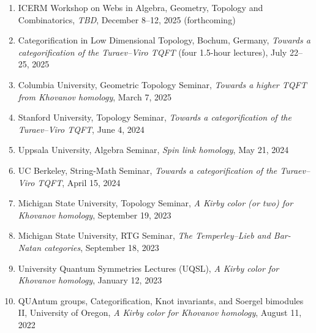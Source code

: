 \documentclass[10pt]{article}
\begin{document}
%
%
%
\begin{enumerate}

\item ICERM Workshop on Webs in Algebra, Geometry, Topology and Combinatorics, 
\emph{TBD},
December 8--12, 2025 (forthcoming)

\item Categorification in Low Dimensional Topology,
Bochum, Germany,
\emph{Towards a categorification of the Turaev--Viro TQFT} (four 1.5-hour lectures),
July 22--25, 2025

\item Columbia University, 
Geometric Topology Seminar,
\emph{Towards a higher TQFT from Khovanov homology},
March 7, 2025

\item Stanford University, 
Topology Seminar,
\emph{Towards a categorification of the Turaev--Viro TQFT},
June 4, 2024

\item Uppsala University, 
Algebra Seminar,
\emph{Spin link homology},
May 21, 2024

\item UC Berkeley, 
String-Math Seminar,
\emph{Towards a categorification of the Turaev--Viro TQFT},
April 15, 2024

\item Michigan State University,
Topology Seminar,
\emph{A Kirby color (or two) for Khovanov homology},
September 19, 2023

\item Michigan State University,
RTG Seminar,
\emph{The Temperley--Lieb and Bar-Natan categories},
September 18, 2023


\item University Quantum Symmetries Lectures (UQSL),
\emph{A Kirby color for Khovanov homology},
January 12, 2023

\item QUAntum groups, Categorification, Knot invariants, and Soergel bimodules II,
University of Oregon,
\emph{A Kirby color for Khovanov homology},
August 11, 2022


\end{enumerate}
\end{document}
